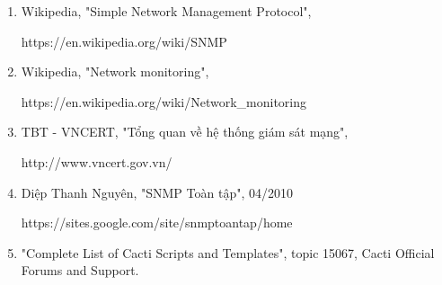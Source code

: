 \documentclass[12pt,oneside,a4paper,reqno]{report}
\begin{document}
\begin{large}
%
\begin{enumerate}
\item Wikipedia, "Simple Network Management Protocol",

https://en.wikipedia.org/wiki/SNMP
\item{Wikipedia, "Network monitoring",

https://en.wikipedia.org/wiki/Network\_monitoring}
\item{TBT - VNCERT, "Tổng quan về hệ thống giám sát mạng",

http://www.vncert.gov.vn/}
\item{Diệp Thanh Nguyên, "SNMP Toàn tập", 04/2010

https://sites.google.com/site/snmptoantap/home}
\item "Complete List of Cacti Scripts and Templates", topic 15067, Cacti Official Forums and Support.
\end{enumerate}
	
\end{large}		
\end{document}
